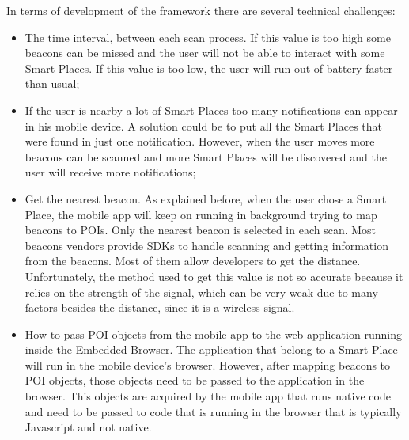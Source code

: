 In terms of development of the framework there are
several technical challenges:
\begin{itemize}

\item The time interval, between each
scan process.
If this value is too high
some beacons can be missed and the user will
not be able to interact with some Smart Places.
If this value is too low, the user will run out
of battery faster than usual;

\item If the user is nearby a lot of Smart Places
too many notifications can appear in his mobile
device. A solution could be to put all
the Smart Places that were found in just one
notification. However, when the user moves more
beacons can be scanned and more Smart Places
will be discovered and the user will receive
more notifications;

\item Get the nearest beacon. As explained before,
when the user chose a Smart Place, the mobile
app will keep on running in background 
trying to map beacons to POIs. Only the
nearest beacon is selected in each scan.
Most beacons vendors provide SDKs to handle
scanning and getting information from the beacons.
Most of them allow developers to get the distance.
Unfortunately, the method used to get this
value is not so accurate because it relies on the strength
of the signal, which can be very weak due to
many factors besides the distance, since it
is a wireless signal.

\item How to pass POI objects from the mobile
app to the web application running inside the
Embedded Browser.
The application that belong to a Smart Place
will run in the mobile device's browser.
However, after mapping beacons to POI objects,
those objects need to be passed to the 
application in the browser. This objects
are acquired by the mobile app that runs
native code and need to be passed to
code that is running in the browser
that is typically Javascript and not native.

\end{itemize}

